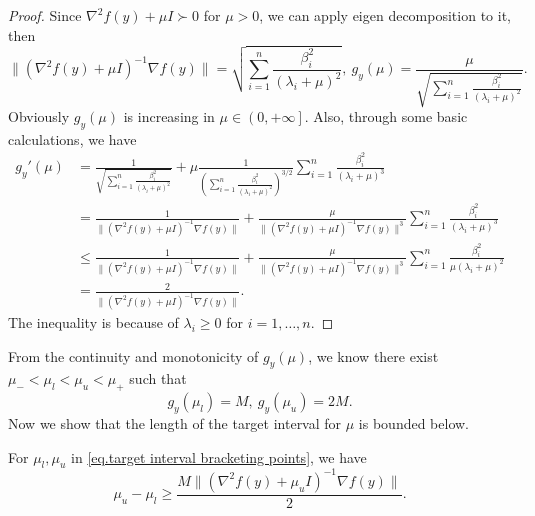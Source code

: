 \documentclass{mcom-l}
\numberwithin{equation}{section}
\begin{document}
\begin{proof}
    Since $\nabla^2 f(y)+\mu I \succ 0$ for $\mu>0$, we can apply eigen decomposition to it, then
    \begin{equation*}
        \|\left (\nabla ^2 f(y)+\mu I \right)^{-1}\nabla f(y)\|=\sqrt{\sum_{i=1}^n \frac{\beta_i^2}{\left (\lambda_i+\mu\right )^2}}, \ g_y(\mu) = \frac{\mu}{\sqrt{\sum_{i=1}^n \frac{\beta_i^2}{\left (\lambda_i+\mu\right )^2}}}.
    \end{equation*}
    Obviously $g_y(\mu)$ is increasing in $\mu \in \left (0,+\infty\right ]$. Also, through some basic calculations, we have
    \begin{equation*}
        \begin{aligned}
            g_y'(\mu) & = \frac{1}{\sqrt{\sum_{i=1}^n \frac{\beta_i^2}{\left (\lambda_i+\mu\right )^2}}}+\mu \frac{1}{\left ( \sum_{i=1}^n \frac{\beta_i^2}{\left (\lambda_i+\mu\right )^2}\right )^{3/2}}\sum_{i=1}^n\frac{\beta_i^2}{\left (\lambda_i+\mu\right )^3} \\
                      & = \frac{1}{\|\left (\nabla ^2 f(y)+\mu I \right)^{-1}\nabla f(y)\|}+\frac{\mu}{\|\left (\nabla ^2 f(y)+\mu I \right)^{-1}\nabla f(y)\|^3}\sum_{i=1}^n\frac{\beta_i^2}{\left (\lambda_i+\mu\right )^3}                                          \\
                      & \leq \frac{1}{\|\left (\nabla ^2 f(y)+\mu I \right)^{-1}\nabla f(y)\|}+\frac{\mu}{\|\left (\nabla ^2 f(y)+\mu I \right)^{-1}\nabla f(y)\|^3}\sum_{i=1}^n\frac{\beta_i^2}{\mu\left (\lambda_i+\mu\right )^2}                                    \\
                      & =  \frac{2}{\|\left (\nabla ^2 f(y)+\mu I \right)^{-1}\nabla f(y)\|}.
        \end{aligned}
    \end{equation*}
    The inequality is because of $\lambda_i \geq 0$ for $i=1,\ldots,n$.
\end{proof}
From the continuity and monotonicity of $g_y(\mu)$, we know there exist $\mu_-<\mu_l<\mu_u<\mu_+$ such that
\begin{equation}\label{eq.target interval bracketing points}
    g_{y}(\mu_l)=M, \ g_{y}(\mu_u)=2M.
\end{equation}
Now we show that the length of the target interval for $\mu$ is bounded below.
\begin{lemma}
    \label{lem.bound target interval}
    For $\mu_l,\mu_u$ in \eqref{eq.target interval bracketing points}, we have
    \begin{equation}
        \label{eq.bound target interval}
        \mu_u-\mu_l \geq \frac{M\|\left (\nabla ^2 f(y)+\mu_u I \right )^{-1}\nabla f(y)\|}{2}.
    \end{equation}
\end{lemma}
\end{document}
